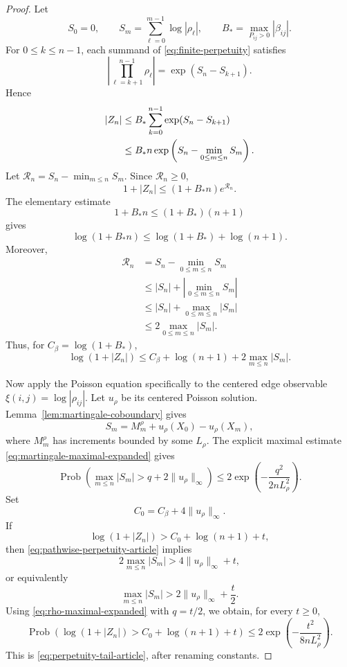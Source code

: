 \documentclass[11pt,a4paper]{amsart}
\theoremstyle{definition}
\theoremstyle{remark}
\numberwithin{equation}{section}
\newcommand{\Prob}{\operatorname{Prob}}
\newcommand{\1}{\boldsymbol 1}
\begin{document}
\begin{proof}

Let
$$
 S_0=0,
 \qquad
 S_m=\sum_{\ell=0}^{m-1}\log|\rho_\ell|,
 \qquad
 B_*=\max_{P_{ij}>0}|\beta_{ij}|.
$$
 For $0\le k\le n-1$, each summand of
\eqref{eq:finite-perpetuity} satisfies
$$
 \left|\prod_{\ell=k+1}^{n-1}\rho_\ell\right|
 =\exp(S_n-S_{k+1}).
$$
Hence
\begin{align}
 |Z_n|
 &\le B_*\sum_{k=0}^{n-1}\exp(S_n-S_{k+1})\notag\\
 &\le B_*n\exp\left(
   S_n-\min_{0\le m\le n}S_m\right).
 \label{eq:perpetuity-pathwise-expanded}
\end{align}
Let
$\mathcal R_n=S_n-\min_{m\le n}S_m$.  Since
$\mathcal R_n\ge0$,
$$
 1+|Z_n|\le(1+B_*n)e^{\mathcal R_n}.
$$
The elementary estimate
$$
 1+B_*n\le(1+B_*)(n+1)
$$
gives
$$
 \log(1+B_*n)\le\log(1+B_*)+\log(n+1).
$$
Moreover,
\begin{align*}
 \mathcal R_n
 &=S_n-\min_{0\le m\le n}S_m\\
 &\le |S_n|+\left|\min_{0\le m\le n}S_m\right|\\
 &\le |S_n|+\max_{0\le m\le n}|S_m|\\
 &\le2\max_{0\le m\le n}|S_m|.
\end{align*}
Thus, for \(C_\beta=\log(1+B_*)\),
\begin{equation}\label{eq:pathwise-perpetuity-article}
 \log(1+|Z_n|)
 \le C_\beta+\log(n+1)+2\max_{m\le n}|S_m|.
\end{equation}
%

Now apply the Poisson equation specifically to the centered edge
observable $\xi(i,j)=\log|\rho_{ij}|$.  Let $u_\rho$ be its
centered Poisson solution.  Lemma~\ref{lem:martingale-coboundary} gives
$$
 S_m=M_m^\rho+u_\rho(X_0)-u_\rho(X_m),
$$
where $M_m^\rho$ has increments bounded by some $L_\rho$.  The
explicit maximal estimate \eqref{eq:martingale-maximal-expanded} gives
\begin{equation}\label{eq:rho-maximal-expanded}
 \Prob\left(
  \max_{m\le n}|S_m|>q+2\|u_\rho\|_\infty
 \right)
 \le2\exp\left(-\frac{q^2}{2nL_\rho^2}\right).
\end{equation}
Set
$$
 C_0=C_\beta+4\|u_\rho\|_\infty.
$$
If
$$
 \log(1+|Z_n|)>C_0+\log(n+1)+t,
$$
then \eqref{eq:pathwise-perpetuity-article} implies
$$
 2\max_{m\le n}|S_m|>4\|u_\rho\|_\infty+t,
$$
or equivalently
$$
 \max_{m\le n}|S_m|
 >2\|u_\rho\|_\infty+\frac t2.
$$
Using \eqref{eq:rho-maximal-expanded} with $q=t/2$, we obtain, for
every $t\ge0$,
\begin{equation}\label{eq:perpetuity-tail-explicit}
 \Prob\left(
  \log(1+|Z_n|)>C_0+\log(n+1)+t
 \right)
 \le2\exp\left(-\frac{t^2}{8nL_\rho^2}\right).
\end{equation}
This is \eqref{eq:perpetuity-tail-article}, after renaming constants.


\end{proof}
\end{document}

